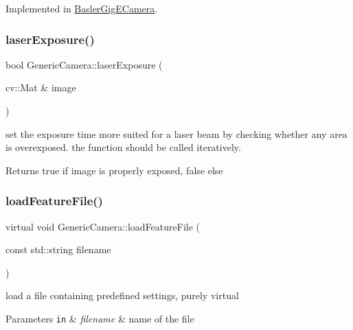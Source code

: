 Implemented in \hyperlink{class_basler_gig_e_camera_a1690e409075c423eec92a039781989df}{Basler\+Gig\+E\+Camera}.

\mbox{\label{class_generic_camera_ad20a7c33465d6791563f77a637ceed83}} 
\subsubsection{\texorpdfstring{laser\+Exposure()}{laserExposure()}}
{\footnotesize\ttfamily bool Generic\+Camera\+::laser\+Exposure (\begin{DoxyParamCaption}\item[{cv\+::\+Mat \&}]{image }\end{DoxyParamCaption})\hspace{0.3cm}{\ttfamily [virtual]}}

set the exposure time more suited for a laser beam by checking whether any area is overexposed. the function should be called iteratively. \begin{DoxyReturn}{Returns}
true if image is properly exposed, false else 
\end{DoxyReturn}
\mbox{\label{class_generic_camera_a393e01ba0b1bc18ad43f00cc62ccea4e}} 
\subsubsection{\texorpdfstring{load\+Feature\+File()}{loadFeatureFile()}}
{\footnotesize\ttfamily virtual void Generic\+Camera\+::load\+Feature\+File (\begin{DoxyParamCaption}\item[{const std\+::string}]{filename }\end{DoxyParamCaption})\hspace{0.3cm}{\ttfamily [pure virtual]}}

load a file containing predefined settings, purely virtual 
\begin{DoxyParams}[1]{Parameters}
\mbox{\tt in}  & {\em filename} & name of the file \\
\hline
\end{DoxyParams}


